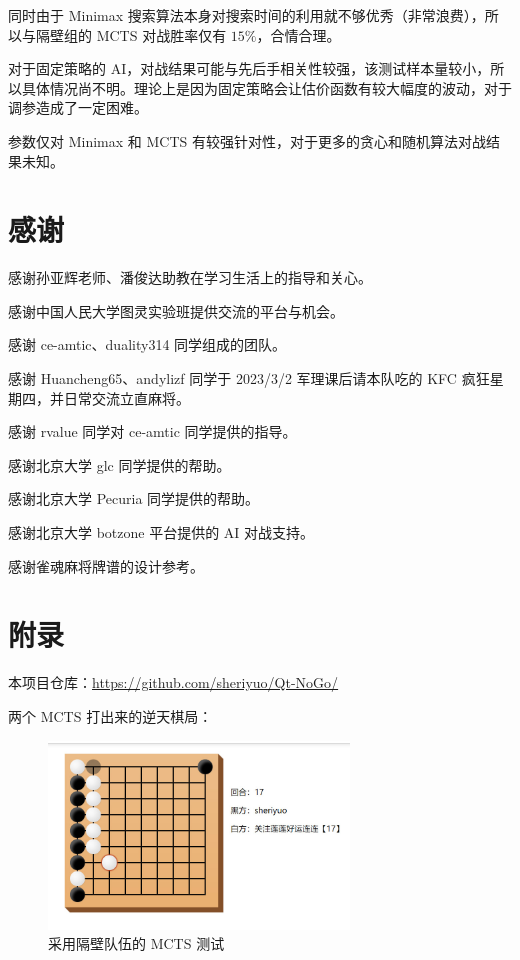 \documentclass{noithesis}
\begin{document}
	同时由于 Minimax 搜索算法本身对搜索时间的利用就不够优秀（非常浪费），所以与隔壁组的 MCTS 对战胜率仅有 $15\%$，合情合理。
	
	对于固定策略的 AI，对战结果可能与先后手相关性较强，该测试样本量较小，所以具体情况尚不明。理论上是因为固定策略会让估价函数有较大幅度的波动，对于调参造成了一定困难。
	
	参数仅对 Minimax 和 MCTS 有较强针对性，对于更多的贪心和随机算法对战结果未知。
		
	\section{感谢}
	
	感谢孙亚辉老师、潘俊达助教在学习生活上的指导和关心。
	
	感谢中国人民大学图灵实验班提供交流的平台与机会。
	
	感谢 ce-amtic、duality314 同学组成的团队。
	
	感谢 Huancheng65、andylizf 同学于 2023/3/2 军理课后请本队吃的 KFC 疯狂星期四，并日常交流立直麻将。
	
	感谢 rvalue 同学对 ce-amtic 同学提供的指导。
	
	感谢北京大学 glc 同学提供的帮助。
	
	感谢北京大学 Pecuria 同学提供的帮助。
	
	感谢北京大学 botzone 平台提供的 AI 对战支持。
	
	感谢雀魂麻将牌谱的设计参考。
	
	\section{附录}
	
	本项目仓库：\href{https://github.com/sheriyuo/Qt-NoGo/}{https://github.com/sheriyuo/Qt-NoGo/}
	
	两个 MCTS 打出来的逆天棋局：
	
	\begin{figure}[!htb]
	
		\centering
		\includegraphics[width=8cm]{img/ps1.jpg}
			
		\caption{采用隔壁队伍的 MCTS 测试}
	\end{figure}
\end{document}
